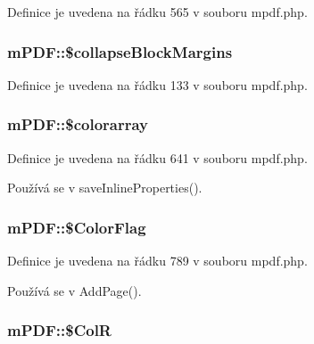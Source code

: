 Definice je uvedena na řádku 565 v souboru mpdf.\-php.

\hypertarget{classm_p_d_f_a70adc7c6a880efe79efeba63b51a03ea}{
\subsubsection[{\$collapse\-Block\-Margins}]{\setlength{\rightskip}{0pt plus 5cm}m\-P\-D\-F\-::\$collapse\-Block\-Margins}}\label{classm_p_d_f_a70adc7c6a880efe79efeba63b51a03ea}


Definice je uvedena na řádku 133 v souboru mpdf.\-php.

\hypertarget{classm_p_d_f_a4d1a8f4520b777359cf585e8e0dcaa63}{
\subsubsection[{\$colorarray}]{\setlength{\rightskip}{0pt plus 5cm}m\-P\-D\-F\-::\$colorarray}}\label{classm_p_d_f_a4d1a8f4520b777359cf585e8e0dcaa63}


Definice je uvedena na řádku 641 v souboru mpdf.\-php.



Používá se v save\-Inline\-Properties().

\hypertarget{classm_p_d_f_aa4fae815bd6a6a8ab4efba4c9949e189}{
\subsubsection[{\$\-Color\-Flag}]{\setlength{\rightskip}{0pt plus 5cm}m\-P\-D\-F\-::\$\-Color\-Flag}}\label{classm_p_d_f_aa4fae815bd6a6a8ab4efba4c9949e189}


Definice je uvedena na řádku 789 v souboru mpdf.\-php.



Používá se v Add\-Page().

\hypertarget{classm_p_d_f_a4b532ad7031530ab66a0ea4d1c7af7d6}{
\subsubsection[{\$\-Col\-R}]{\setlength{\rightskip}{0pt plus 5cm}m\-P\-D\-F\-::\$\-Col\-R}}\label{classm_p_d_f_a4b532ad7031530ab66a0ea4d1c7af7d6}


